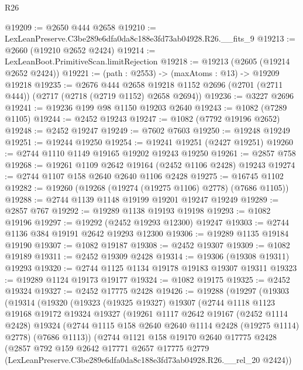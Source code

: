 \begin{lexlean}{R26}
\begin{coremodule}
@19209 := @2650 @444 @2658
@19210 := LexLeanPreserve.C3be289e6dfa0da8c188e3fd73ab04928.R26.__fits_9
@19213 := @2660 (@19210 @2652 @2424)
@19214 := LexLeanBoot.PrimitiveScan.limitRejection
@19218 := @19213 (@2605 (@19214 @2652 @2424))
@19221 := (path : @2553) -> (maxAtoms : @13) -> @19209 @19218
@19235 := @2676
    @444
    @2658
    @19218
    @1152
    @2696
    (@2701 (@2711 @444))
    (@2717 (@2718 (@2719 @1152) @2658 @2694))
@19236 := @3227 @2696
@19241 := @19236 @199 @98 @1150 @19203 @2640
@19243 := @1082 (@7289 @1105)
@19244 := @2452 @19243
@19247 := @1082 (@7792 @19196 @2652)
@19248 := @2452 @19247
@19249 := @7602 @7603
@19250 := @19248 @19249
@19251 := @19244 @19250
@19254 := @19241 @19251 (@2427 @19251)
@19260 := @2744 @1110 @1149 @19165 @19202 @19243 @19250
@19261 := @2857 @758
@19268 := @19261 @1109 @2642 @19164 (@2452 @1106 @2428) @19243
@19274 := @2744 @1107 @158 @2640 @2640 @1106 @2428
@19275 := @16745 @1102
@19282 := @19260 (@19268 (@19274 (@19275 @1106) @2778) (@7686 @1105))
@19288 := @2744 @1139 @1148 @19199 @19201 @19247 @19249
@19289 := @2857 @767
@19292 := @19289 @1138 @19193 @19198
@19293 := @1082 @19196
@19297 := @19292 (@2452 @19293 @12300) @19247
@19303 := @2744 @1136 @384 @19191 @2642 @19293 @12300
@19306 := @19289 @1135 @19184 @19190
@19307 := @1082 @19187
@19308 := @2452 @19307
@19309 := @1082 @19189
@19311 := @2452 @19309 @2428
@19314 := @19306 (@19308 @19311) @19293
@19320 := @2744 @1125 @1134 @19178 @19183 @19307 @19311
@19323 := @19289 @1124 @19173 @19177
@19324 := @1082 @19175
@19325 := @2452 @19324
@19327 := @2452 @17775 @2428
@19426 := @19288
    (@19297
      (@19303
        (@19314
          (@19320
            (@19323
              (@19325 @19327)
              @19307
              (@2744
                @1118
                @1123
                @19168
                @19172
                @19324
                @19327
                (@19261
                  @1117
                  @2642
                  @19167
                  (@2452 @1114 @2428)
                  @19324
                  (@2744 @1115 @158 @2640 @2640 @1114 @2428 (@19275 @1114) @2778)
                  (@7686 @1113))
                (@2744
                  @1121
                  @158
                  @19170
                  @2640
                  @17775
                  @2428
                  (@2857
                    @792
                    @159
                    @2642
                    @17771
                    @2657
                    @17775
                    @2779
                    (LexLeanPreserve.C3be289e6dfa0da8c188e3fd73ab04928.R26.__rel_20 @2424))

\end{coremodule}
\end{lexlean}
